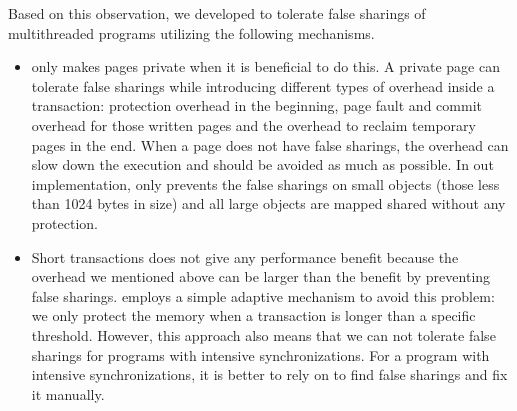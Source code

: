 Based on this observation, we developed \SheriffProtect{} to tolerate false sharings
of multithreaded programs utilizing the following mechanisms. 

\begin{itemize}
\item
\SheriffProtect{} only makes pages private when it is beneficial to do this. 
A private page can tolerate false sharings while introducing 
different types of overhead inside a transaction: 
protection overhead in the beginning, 
page fault and commit overhead for those written pages and the overhead to reclaim temporary pages 
in the end.
When a page does not have false sharings, 
the overhead can slow down the execution and should be avoided as much as possible.
In out implementation, \SheriffProtect{} only prevents the false sharings
on small objects (those less than 1024 bytes in size) and all large objects 
are mapped shared without any protection. 
 

\item
Short transactions does not give any performance benefit because the overhead we mentioned above
can be larger than the benefit by preventing false sharings.
\SheriffProtect{} employs a simple adaptive mechanism to avoid this problem: 
we only protect the memory when a transaction is longer than a specific threshold. 
However, this approach also means that we can not tolerate false sharings for 
programs with intensive synchronizations. 
For a program with intensive synchronizations, 
it is better to rely on
\SheriffDetect{} to find false sharings and fix it manually.  

\end{itemize}
 

